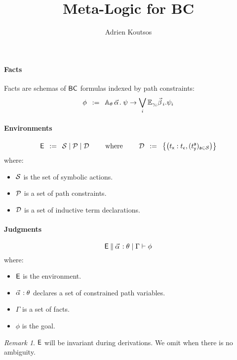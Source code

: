 \documentclass[a4paper]{article}
\theoremstyle{remark}
\newtheorem{remark}{Remark}
\begin{document}
\title{Meta-Logic for BC}


\author{Adrien Koutsos}

\maketitle

\paragraph{Facts}
Facts are schemas of $\textsf{BC}$ formulas indexed by path constraints:
\[
  \phi \mdef
  \cforall_\theta\, \valpha.\;
  \psi
  \ra
  \bigvee_{i}
  \cexists_\gammai \vbetai. \psi_i
\]

\paragraph{Environments}
\[
  \textsf{E} \;\;\mathbin{:=}\;\;
  \mathcal{S} \mid
  \mathcal{P} \mid
  \mathcal{D}
  \qquad
  \text{ where }
  \qquad
  \mathcal{D} \;\;\mathbin{:=}\;\;
  \left\{
    \left(t_{\textsf{x}} : t_\epsilon,(t_{\textsf{y}}^{\textsf{a}})_{{\textsf{a}} \in \mathcal{S}}\right)
  \right\}
\]
where:
\begin{itemize}
\item $\mathcal{S}$ is the set of symbolic actions.
\item $\mathcal{P}$ is a set of path constraints.
\item $\mathcal{D}$ is a set of inductive term declarations.
\end{itemize}
\paragraph{Judgments}
\[
  \ejudge{\env}{\facts{\valpha}{\theta}{\Gamma}}{\phi}
\]
where:
\begin{itemize}
\item $\textsf{E}$ is the environment.
\item $\pvtype{\valpha}{\theta}$ declares a set of constrained path variables.
\item $\Gamma$ is a set of facts.
\item $\phi$ is the goal.
\end{itemize}

\begin{remark}
  $\textsf{E}$ will be invariant during derivations. We omit when there is no ambiguity.
\end{remark}
\end{document}
